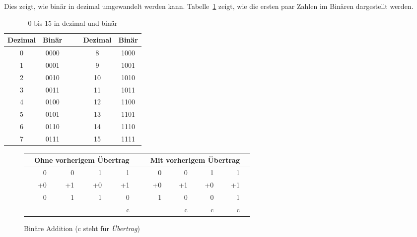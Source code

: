 Dies zeigt, wie bin\"{a}r in dezimal umgewandelt werden kann.
Tabelle~\ref{tab:dec-bin} zeigt, wie die ersten paar Zahlen im
Bin\"{a}ren dargestellt werden.
\begin{table}[ht]
\begin{center}
\begin{tabular}{||c|c||cc||c|c||}
\hline
 Dezimal & Bin\"{a}r & & & Dezimal & Bin\"{a}r \\
\hline
 0       & 0000   & & & 8       & 1000 \\
\hline
 1       & 0001   & & & 9       & 1001 \\
\hline
 2       & 0010   & & & 10      & 1010 \\
\hline
 3       & 0011   & & & 11      & 1011 \\
\hline
 4       & 0100   & & & 12      & 1100 \\
\hline
 5       & 0101   & & & 13      & 1101 \\
\hline
 6       & 0110   & & & 14      & 1110 \\
\hline
 7       & 0111   & & & 15      & 1111 \\
\hline
\end{tabular}
\caption{0 bis 15 in dezimal und bin\"{a}r\label{tab:dec-bin}}
\end{center}
\end{table}


\begin{figure}[ht]
\begin{center}
\begin{tabular}{|rrrrrrrrp{.1cm}|p{.1cm}rrrrrrrr|}
\hline
& \multicolumn{7}{c}{Ohne vorherigem \"{U}bertrag} & & & \multicolumn{7}{c}{Mit vorherigem \"{U}bertrag} & \\
\hline
 &  0 & &  0 & &  1 & &  1 & & &  0 & &  0 & &  1 & & 1  & \\
 & +0 & & +1 & & +0 & & +1 & & & +0 & & +1 & & +0 & & +1 &  \\
\cline{2-2} \cline{4-4} \cline{6-6} \cline{8-8} \cline{11-11} \cline{13-13} \cline{15-15} \cline{17-17}
 & 0  & & 1  & & 1  & & 0  & & & 1  & & 0  & & 0  & & 1 & \\
 &    & &    & &    & & c  & & &    & & c  & & c  & & c & \\
\hline
\end{tabular}

\caption[Bin\"{a}re Addition]{Bin\"{a}re Addition (c steht f\"{u}r
\emph{\"{U}bertrag}) \label{fig:bin-add}}
\end{center}
\end{figure}

